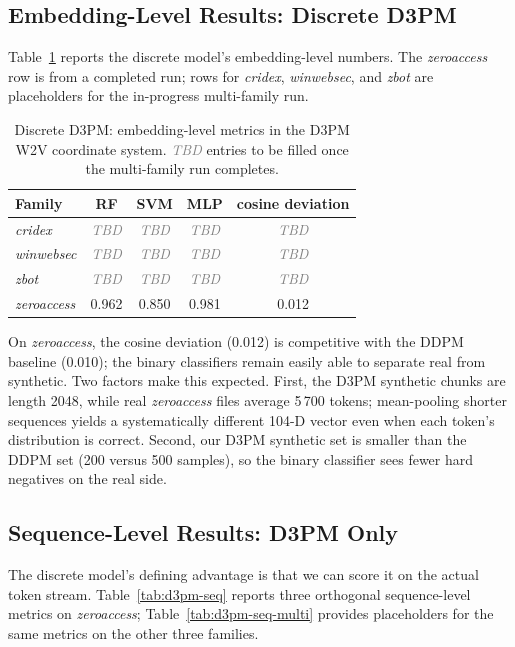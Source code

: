\documentclass[runningheads]{llncs}
\newcommand{\todoval}{\textcolor{gray}{\textit{TBD}}}
\begin{document}
\subsection{Embedding-Level Results: Discrete D3PM}

Table~\ref{tab:d3pm-emb} reports the discrete model's embedding-level
numbers. The \emph{zeroaccess} row is from a completed run; rows for
\emph{cridex}, \emph{winwebsec}, and \emph{zbot} are placeholders for the
in-progress multi-family run.

\begin{table}[h]
\centering
\caption{Discrete D3PM: embedding-level metrics in the D3PM W2V coordinate
system. \todoval{} entries to be filled once the multi-family run completes.}
\label{tab:d3pm-emb}
\begin{tabular}{lcccc}
\toprule
Family & RF & SVM & MLP & cosine deviation \\
\midrule
\emph{cridex}      & \todoval & \todoval & \todoval & \todoval \\
\emph{winwebsec}   & \todoval & \todoval & \todoval & \todoval \\
\emph{zbot}        & \todoval & \todoval & \todoval & \todoval \\
\emph{zeroaccess}  & 0.962    & 0.850    & 0.981    & 0.012    \\
\bottomrule
\end{tabular}
\end{table}

On \emph{zeroaccess}, the cosine deviation (0.012) is competitive with the
DDPM baseline (0.010); the binary classifiers remain easily able to separate
real from synthetic. Two factors make this expected. First, the D3PM
synthetic chunks are length 2048, while real \emph{zeroaccess} files average
5\,700 tokens; mean-pooling shorter sequences yields a systematically
different 104-D vector even when each token's distribution is correct.
Second, our D3PM synthetic set is smaller than the DDPM set (200 versus 500
samples), so the binary classifier sees fewer hard negatives on the real side.

\subsection{Sequence-Level Results: D3PM Only}
\label{sec:results-seq}

The discrete model's defining advantage is that we can score it on the actual
token stream. Table~\ref{tab:d3pm-seq} reports three orthogonal sequence-level
metrics on \emph{zeroaccess}; Table~\ref{tab:d3pm-seq-multi} provides
placeholders for the same metrics on the other three families.
\end{document}
